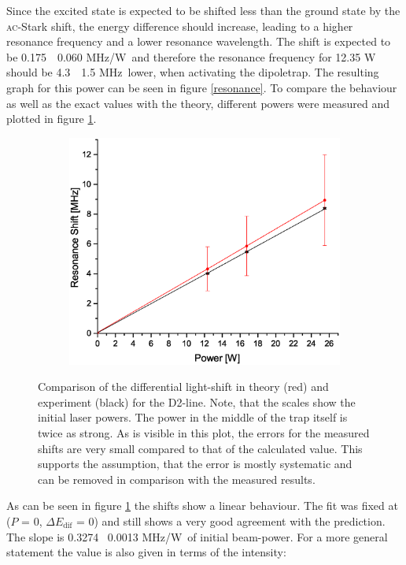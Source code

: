 Since the excited state is expected to be shifted less than the ground state by the \textsc{ac}-Stark shift, the energy difference should increase, leading to a higher resonance frequency and a lower resonance wavelength. The shift is expected to be 0.175\ \pm\ 0.060 \footnotesize{MHz/W}\normalsize\ and therefore the resonance frequency for 12.35 \textsc{W} should be 4.3\ \pm\ 1.5 \footnotesize{MHz}\normalsize\ lower, when activating the dipoletrap. The resulting graph for this power can be seen in figure \ref{resonance}. To compare the behaviour as well as the exact values with the theory, different powers were measured and plotted in figure \ref{shifts}. 
\begin{figure}[h]
\centering
\begin{subfigure}[b]{0.8\textwidth}
                \includegraphics[width=\textwidth]{Shift2}
\end{subfigure}
\caption{Comparison of the differential light-shift in theory (red) and experiment (black) for the D2-line. Note, that the scales show the initial laser powers. The power in the middle of the trap itself is twice as strong. As is visible in this plot, the errors for the measured shifts are very small compared to that of the calculated value. This supports the assumption, that the error is mostly systematic and can be removed in comparison with the measured results.}
\label{shifts}
\end{figure}
As can be seen in figure \ref{shifts} the shifts show a linear behaviour. The fit was fixed at ($P$ = $0$, $\Delta E_\mathrm{dif}$ = $0$) and still shows a very good  agreement with the prediction. The slope is 0.3274 \pm\ 0.0013 \footnotesize{MHz/W}\normalsize\ of initial beam-power. For a more general statement the value is also given in terms of the intensity:
